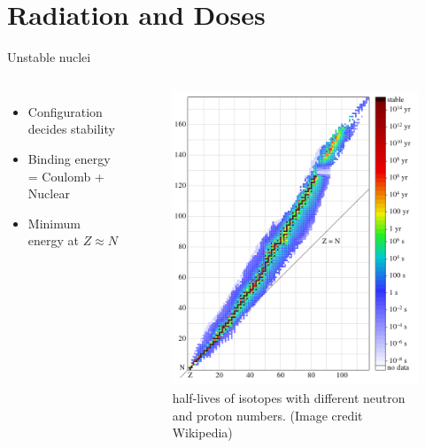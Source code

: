 \documentclass[10pt]{beamer}
\begin{document}
\section{Radiation and Doses}
\begin{frame}{Unstable nuclei}
  \begin{columns}[T,onlytextwidth]
      \begin{itemize}
      	\item Configuration decides stability
      	\item Binding energy = Coulomb + Nuclear
      	\item Minimum energy at $Z\approx N$
      \end{itemize}

		\begin{figure}
		\centering
		\includegraphics[height=0.8\textheight]{stability.png}
		\caption*{half-lives of isotopes with different neutron and proton numbers. (Image credit Wikipedia)}
        \end{figure}
  \end{columns}
\end{frame}
\end{document}
